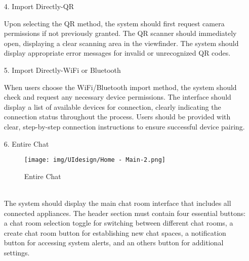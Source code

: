 \documentclass[conference]{IEEEtran}
\begin{document}
\begin{enumerate}
    \item[4.] Import Directly-QR
    
    Upon selecting the QR method, the system should first request camera permissions if not previously granted. The QR scanner should immediately open, displaying a clear scanning area in the viewfinder. The system should display appropriate error messages for invalid or unrecognized QR codes. \\ 
\end{enumerate}

\begin{enumerate}
    \item[5.] Import Directly-WiFi or Bluetooth
    
    When users choose the WiFi/Bluetooth import method, the system should check and request any necessary device permissions. The interface should display a list of available devices for connection, clearly indicating the connection status throughout the process. Users should be provided with clear, step-by-step connection instructions to ensure successful device pairing.
\end{enumerate}

\clearpage

\begin{enumerate}
    \item[6.] Entire Chat
    \begin{figure}[h]
\hspace{1.5cm}
\centering
\begin{minipage}{0.4\columnwidth}
    \texttt{[image: img/UIdesign/Home - Main-2.png]}
    \caption{Entire Chat}
\end{minipage}
\end{figure}
    \\ The system should display the main chat room interface that includes all connected appliances. The header section must contain four essential buttons: a chat room selection toggle for switching between different chat rooms, a create chat room button for establishing new chat spaces, a notification button for accessing system alerts, and an others button for additional settings. \\
\end{enumerate}
\end{document}
